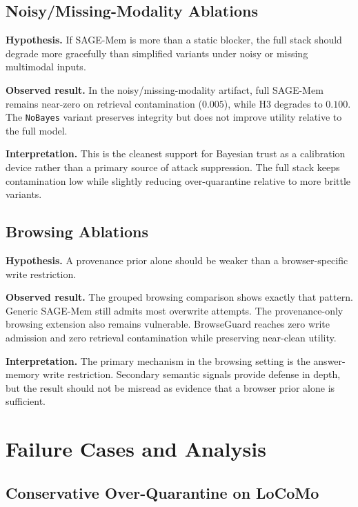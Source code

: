 \documentclass{article}
\begin{document}
\subsection{Noisy/Missing-Modality Ablations}

\noindent\textbf{Hypothesis.} If SAGE-Mem is more than a static blocker, the full stack should degrade more gracefully than simplified variants under noisy or missing multimodal inputs.

\noindent\textbf{Observed result.} In the noisy/missing-modality artifact, full SAGE-Mem remains near-zero on retrieval contamination (\(0.005\)), while H3 degrades to \(0.100\). The \texttt{NoBayes} variant preserves integrity but does not improve utility relative to the full model.

\noindent\textbf{Interpretation.} This is the cleanest support for Bayesian trust as a calibration device rather than a primary source of attack suppression. The full stack keeps contamination low while slightly reducing over-quarantine relative to more brittle variants.

\subsection{Browsing Ablations}

\noindent\textbf{Hypothesis.} A provenance prior alone should be weaker than a browser-specific write restriction.

\noindent\textbf{Observed result.} The grouped browsing comparison shows exactly that pattern. Generic SAGE-Mem still admits most overwrite attempts. The provenance-only browsing extension also remains vulnerable. BrowseGuard reaches zero write admission and zero retrieval contamination while preserving near-clean utility.

\noindent\textbf{Interpretation.} The primary mechanism in the browsing setting is the answer-memory write restriction. Secondary semantic signals provide defense in depth, but the result should not be misread as evidence that a browser prior alone is sufficient.

\section{Failure Cases and Analysis}

\subsection{Conservative Over-Quarantine on LoCoMo}
\end{document}
